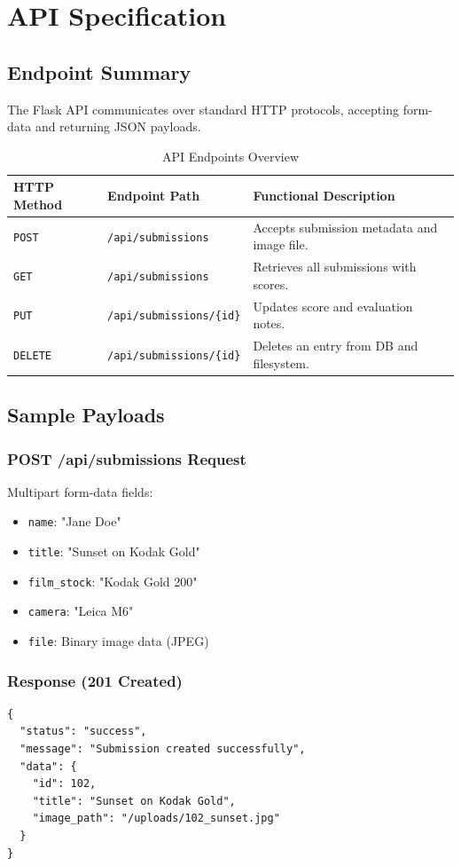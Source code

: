 \chapter{API Specification}

\section{Endpoint Summary}
The Flask API communicates over standard HTTP protocols, accepting form-data and returning JSON payloads.

\begin{table}[h!]
\centering
\renewcommand{\arraystretch}{1.4}
\begin{tabular}{|l|l|p{6cm}|}
\hline
\textbf{HTTP Method} & \textbf{Endpoint Path} & \textbf{Functional Description} \\ \hline
\texttt{POST} & \texttt{/api/submissions} & Accepts submission metadata and image file. \\ \hline
\texttt{GET} & \texttt{/api/submissions} & Retrieves all submissions with scores. \\ \hline
\texttt{PUT} & \texttt{/api/submissions/\{id\}} & Updates score and evaluation notes. \\ \hline
\texttt{DELETE} & \texttt{/api/submissions/\{id\}} & Deletes an entry from DB and filesystem. \\ \hline
\end{tabular}
\caption{API Endpoints Overview}
\end{table}

\section{Sample Payloads}

\subsection{POST /api/submissions Request}
Multipart form-data fields:
\begin{itemize}
    \item \texttt{name}: "Jane Doe"
    \item \texttt{title}: "Sunset on Kodak Gold"
    \item \texttt{film\_stock}: "Kodak Gold 200"
    \item \texttt{camera}: "Leica M6"
    \item \texttt{file}: Binary image data (JPEG)
\end{itemize}

\subsection{Response (201 Created)}
\begin{verbatim}
{
  "status": "success",
  "message": "Submission created successfully",
  "data": {
    "id": 102,
    "title": "Sunset on Kodak Gold",
    "image_path": "/uploads/102_sunset.jpg"
  }
}
\end{verbatim}